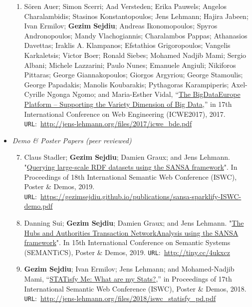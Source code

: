\begin{itemize}
\begin{enumerate}
    \item Sören Auer; Simon Scerri; Aad Versteden; Erika Pauwels; Angelos Charalambidis; Stasinos Konstantopoulos; Jens Lehmann; Hajira Jabeen; Ivan Ermilov; \textbf{Gezim Sejdiu}; Andreas Ikonomopoulos; Spyros Andronopoulos; Mandy Vlachogiannis; Charalambos Pappas; Athanasios Davettas; Iraklis A. Klampanos; Efstathios Grigoropoulos; Vangelis Karkaletsis; Victor Boer; Ronald Siebes; Mohamed Nadjib Mami; Sergio Albani; Michele Lazzarini; Paulo Nunes; Emanuele Angiuli; Nikiforos Pittaras; George Giannakopoulos; Giorgos Argyriou; George Stamoulis; George Papadakis; Manolis Koubarakis; Pythagoras Karampiperis; Axel-Cyrille Ngonga Ngomo; and Maria-Esther Vidal, “\href{http://jens-lehmann.org/files/2017/icwe_bde.pdf}{The BigDataEurope Platform – Supporting the Variety Dimension of Big Data},” in 17th International Conference on Web Engineering (ICWE2017), 2017. \texttt{URL}:~\url{http://jens-lehmann.org/files/2017/icwe_bde.pdf}
     
\end{enumerate}
    \item \emph{Demo \& Poster Papers (peer reviewed)}
    \begin{enumerate}
    \setcounter{enumi}{6}

    \item Claus Stadler; \textbf{Gezim Sejdiu}; Damien Graux; and Jens Lehmann. "\href{https://gezimsejdiu.github.io/publications/sansa-sparklify-ISWC-demo.pdf}{Querying large-scale RDF datasets using the SANSA framework}".  In Proceedings of 18th International Semantic Web Conference (ISWC), Poster \& Demos, 2019. \texttt{URL}:~\url{https://gezimsejdiu.github.io/publications/sansa-sparklify-ISWC-demo.pdf}

    \item Danning Sui; \textbf{Gezim Sejdiu}; Damien Graux; and Jens Lehmann. "\href{https://gezimsejdiu.github.io/publications/sansa-hubs-and-authorities-transaction-semantics19-poster.pdf}{The Hubs and Authorities Transaction NetworkAnalysis using the SANSA framework}".  In 15th International Conference on Semantic Systems (SEMANTiCS), Poster \& Demos, 2019. \texttt{URL}:~\url{http://tiny.cc/4ukxcz}
    
    \item \textbf{Gezim Sejdiu}; Ivan Ermilov; Jens Lehmann; and Mohamed-Nadjib Mami, “\href{http://jens-lehmann.org/files/2018/iswc_statisfy_pd.pdf}{STATisfy Me: What are my Stats?},” in Proceedings of 17th International Semantic Web Conference (ISWC), Poster \& Demos, 2018. \texttt{URL}:~\url{http://jens-lehmann.org/files/2018/iswc_statisfy_pd.pdf}
    

\end{enumerate}
\end{itemize}
